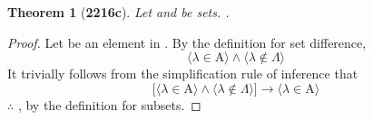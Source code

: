 \documentclass[preview]{standalone}
\newtheorem*{theorem*}{Theorem}
\begin{document}
\begin{theorem*}[\textbf{2216c}] \color{black}
    Let  and \bm{$\Lambda$} be sets. 
    .
\end{theorem*}
\begin{proof} \color{black}
    Let \bm{$\lambda$} be an element in . 
    By the definition for set difference,
    \begin{equation*}
        \Big \langle \lambda \in \mathrm{A} \Big \rangle
            \land
        \Big \langle \lambda \notin \Lambda \Big \rangle   
    \end{equation*}
    It trivially follows from the simplification rule of inference that
    \begin{equation*}
        \bigg[
            \Big \langle \lambda \in \mathrm{A} \Big \rangle
                \land
            \Big \langle \lambda \notin \Lambda \Big \rangle
        \bigg]
            \rightarrow
        \Big \langle \lambda \in \mathrm{A} \Big \rangle
    \end{equation*}
    $\therefore$ 
    ,
    by the definition for subsets.
\color{lightgray} \end{proof}
\end{document}
